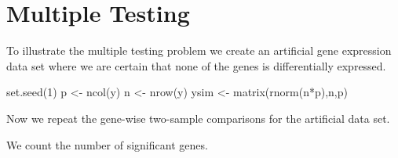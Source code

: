 \documentclass[
]{book}
\newenvironment{Shaded}{\begin{snugshade}}{\end{snugshade}}
\newcommand{\AttributeTok}[1]{\textcolor[rgb]{0.77,0.63,0.00}{#1}}
\newcommand{\ConstantTok}[1]{\textcolor[rgb]{0.00,0.00,0.00}{#1}}
\newcommand{\ControlFlowTok}[1]{\textcolor[rgb]{0.13,0.29,0.53}{\textbf{#1}}}
\newcommand{\DecValTok}[1]{\textcolor[rgb]{0.00,0.00,0.81}{#1}}
\newcommand{\FunctionTok}[1]{\textcolor[rgb]{0.00,0.00,0.00}{#1}}
\newcommand{\NormalTok}[1]{#1}
\newcommand{\OtherTok}[1]{\textcolor[rgb]{0.56,0.35,0.01}{#1}}
\newcommand{\SpecialCharTok}[1]{\textcolor[rgb]{0.00,0.00,0.00}{#1}}
\begin{document}
\hypertarget{multiple-testing}{%
\section{Multiple Testing}\label{multiple-testing}}

To illustrate the multiple testing problem we create an artificial gene expression data set where we are certain that none of the genes is differentially expressed.

\begin{Shaded}
\begin{Highlighting}[]
\FunctionTok{set.seed}\NormalTok{(}\DecValTok{1}\NormalTok{)}
\NormalTok{p }\OtherTok{\textless{}{-}} \FunctionTok{ncol}\NormalTok{(y)}
\NormalTok{n }\OtherTok{\textless{}{-}} \FunctionTok{nrow}\NormalTok{(y)}
\NormalTok{ysim }\OtherTok{\textless{}{-}} \FunctionTok{matrix}\NormalTok{(}\FunctionTok{rnorm}\NormalTok{(n}\SpecialCharTok{*}\NormalTok{p),n,p)}
\end{Highlighting}
\end{Shaded}

Now we repeat the gene-wise two-sample comparisons for the artificial data set.

\begin{Shaded}
\end{Shaded}

We count the number of significant genes.
\end{document}
